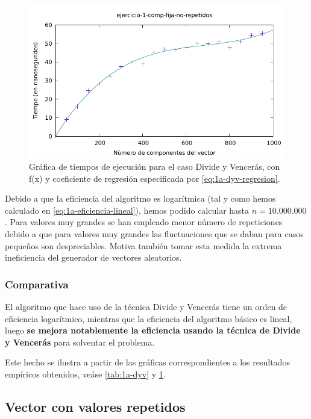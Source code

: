 \begin{figure}
	\centering
	\includegraphics[scale=0.76]{img/e1a-dyv}
	\caption{Gráfica de tiempos de ejecución para el caso Divide y Vencerás, 
		con f(x) y coeficiente de regresión especificada por \ref{eq:1a-dyv-regresion}.}
	\label{fig:1a-dyv-graph}
\end{figure}

Debido a que la eficiencia del algoritmo es logarítmica (tal y como hemos calculado en \ref{eq:1a-eficiencia-lineal}),
hemos podido calcular hasta $n = 10.000.000$. Para valores muy grandes se han empleado menor número de repeticiones
debido a que para valores muy grandes las fluctuaciones que se daban para casos pequeños son despreciables. 
Motiva también tomar esta medida la extrema ineficiencia del generador de vectores aleatorios. 

\subsubsection{Comparativa}

El algoritmo que hace uso de la técnica Divide y Vencerás tiene un orden de eficiencia logarítmico, mientras
que la eficiencia del algoritmo básico es lineal, luego \textbf{se mejora notablemente la eficiencia usando la técnica de 
Divide y Vencerás} para solventar el problema. 

Este hecho se ilustra a partir de las gráficas correspondientes a los resultados empíricos obtenidos, veáse 
\ref{tab:1a-dyv} y \ref{fig:1a-dyv-graph}.

\subsection{Vector con valores repetidos}


